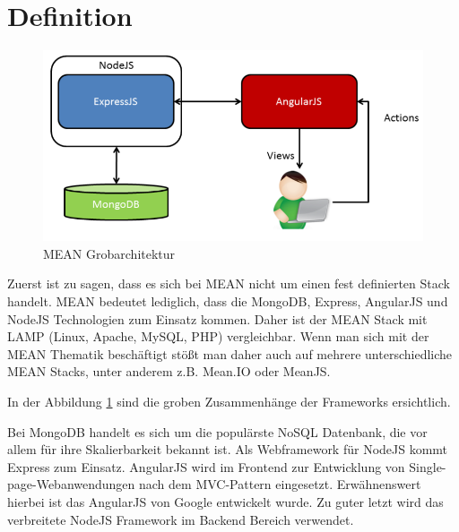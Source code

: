 \section{Definition}
\label{definition-fabi}

\begin{figure}[h]
	\centering
	\includegraphics[width=0.7\linewidth]{figures/mean-grobarchitektur.png}
	\caption{MEAN Grobarchitektur}
	\label{f:mean-grobarchitektur}
\end{figure}

Zuerst ist zu sagen, dass es sich bei MEAN nicht um einen fest definierten Stack handelt. MEAN bedeutet lediglich, dass die MongoDB, Express, AngularJS und NodeJS Technologien zum Einsatz kommen. Daher ist der MEAN Stack mit LAMP (Linux, Apache, MySQL, PHP) vergleichbar. Wenn man sich mit der MEAN Thematik beschäftigt stößt man daher auch auf mehrere unterschiedliche MEAN Stacks, unter anderem z.B. Mean.IO oder MeanJS.

In der Abbildung \ref{f:mean-grobarchitektur} sind die groben Zusammenhänge der Frameworks ersichtlich.

Bei MongoDB handelt es sich um die populärste NoSQL Datenbank, die vor allem für ihre Skalierbarkeit bekannt ist. Als Webframework für NodeJS kommt Express zum Einsatz. AngularJS wird im Frontend zur Entwicklung von Single-page-Webanwendungen nach dem MVC-Pattern eingesetzt. Erwähnenswert hierbei ist das AngularJS von Google entwickelt wurde. Zu guter letzt wird das verbreitete NodeJS Framework im Backend Bereich verwendet.